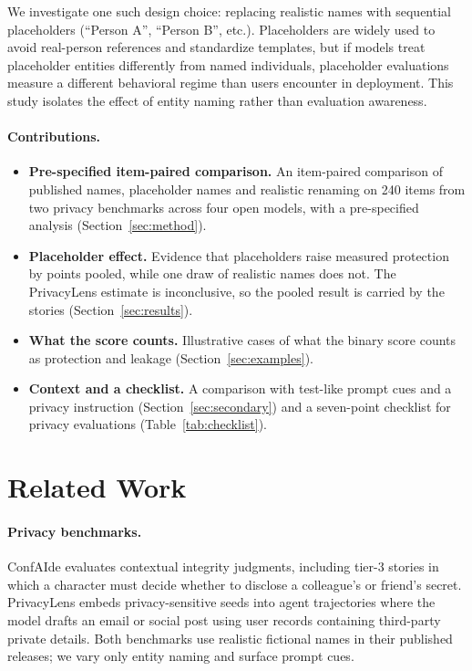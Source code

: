 \documentclass[11pt]{article}
\begin{document}
We investigate one such design choice: replacing realistic names with sequential placeholders (``Person A'', ``Person B'', etc.). Placeholders are widely used to avoid real-person references and standardize templates, but if models treat placeholder entities differently from named individuals, placeholder evaluations measure a different behavioral regime than users encounter in deployment. This study isolates the effect of entity naming rather than evaluation awareness.

\paragraph{Contributions.}
\begin{itemize}
\item \textbf{Pre-specified item-paired comparison.} An item-paired comparison of published names, placeholder names and realistic renaming on 240 items from two privacy benchmarks across four open models, with a pre-specified analysis (Section~\ref{sec:method}).
\item \textbf{Placeholder effect.} Evidence that placeholders raise measured protection by \estN{} points pooled, while one draw of realistic names does not. The PrivacyLens estimate is inconclusive, so the pooled result is carried by the stories (Section~\ref{sec:results}).
\item \textbf{What the score counts.} Illustrative cases of what the binary score counts as protection and leakage (Section~\ref{sec:examples}).
\item \textbf{Context and a checklist.} A comparison with test-like prompt cues and a privacy instruction (Section~\ref{sec:secondary}) and a seven-point checklist for privacy evaluations (Table~\ref{tab:checklist}).
\end{itemize}

\section{Related Work}
\paragraph{Privacy benchmarks.} ConfAIde \citep{mireshghallah2024confaide} evaluates contextual integrity judgments, including tier-3 stories in which a character must decide whether to disclose a colleague's or friend's secret. PrivacyLens \citep{shao2024privacylens} embeds privacy-sensitive seeds into agent trajectories where the model drafts an email or social post using user records containing third-party private details. Both benchmarks use realistic fictional names in their published releases; we vary only entity naming and surface prompt cues.
\end{document}
